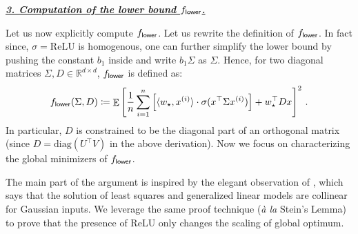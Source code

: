 \documentclass{article}
\DeclareMathOperator{\E}{\mathbb{E}}
\newcommand{\R}{\mathbb{R}}
\newcommand{\relu}{\sigma}
\newcommand{\cc}{b}
\newcommand{\wstar}{w_\star}
\newcommand{\tx}[1]{x^{(#1)}}
\newcommand{\ttf}{f_{\sf lower}}
\newcommand{\emphh}[1]{\textbf{\emph{#1}}}
\newcommand{\inpp}[2]{ \langle #1,#2\rangle}
\newcommand{\diag}{\mathrm{diag}}
\begin{document}
 \underline{\emphh{3. Computation of the lower bound $\ttf$.}}


Let us now explicitly compute
$\ttf$. Let us rewrite the definition of $\ttf$.
In fact since, $\relu = \mathrm{ReLU}$ is homogenous, one can further simplify the lower bound by pushing the constant $\cc_1$ inside and write $\cc_1 \Sigma$  as $\Sigma$.
Hence, for two diagonal matrices $\Sigma, D\in \R^{d\times d}$, $\ttf$ is defined as:
\begin{align}
    \ttf(\Sigma, D) \coloneqq  \E \left[  \frac{1}{n}\sum_{i=1}^n \left[ \inpp{\wstar}{\tx{i}}\cdot \relu (x^\top \Sigma \tx{i}  )\right] +  \wstar^\top D x   \right]^2\,.
\end{align}
In particular, $D$ is constrained to be the diagonal part of an orthogonal matrix (since $D=  \diag( U^\top V)$ in the above derivation).
Now we focus on characterizing the global minimizers of $\ttf$.

The main part of the argument is inspired by the elegant observation of \cite{erdogdu2016scaled}, which says that the solution of least squares and generalized linear models are collinear for Gaussian inputs. 
We leverage the same proof technique (\emph{\`{a} la} Stein's Lemma) to prove that the presence of ReLU only changes the scaling of global optimum. 
\end{document}

